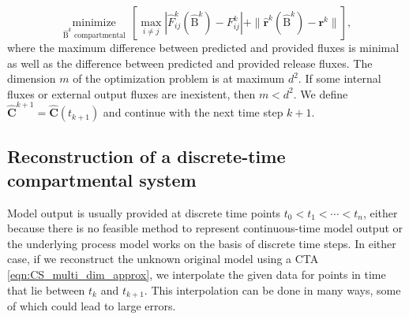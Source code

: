 \documentclass[11pt,a4paper]{article}
\newcommand{\red}[1]{\textcolor{red}{#1}}
\renewcommand{\vec}[1]{\mathbf{#1}}
\newcommand{\tens}[1]{\mathrm{#1}}
\begin{document}
        \begin{equation*}
            \underset{\widehat{\tens{B}}^k\text{ compartmental}}{\operatorname{minimize}}\,\left[\max\limits_{i\neq j} |\widehat{F}^k_{ij}(\widehat{\tens{B}}^k)-F^k_{ij}| + \|\widehat{\vec{r}}^k(\widehat{\tens{B}}^k)-\vec{r}^k \| \right],
        \end{equation*}
        where the maximum difference between predicted and provided fluxes is minimal as well as the difference between predicted and provided release fluxes. 
        The dimension $m$ of the optimization problem is at maximum $d^2$.
        If some internal fluxes or external output fluxes are inexistent, then $m<d^2$.
        We define $\widehat{\vec{C}}^{k+1}=\widehat{\vec{C}}(t_{k+1})$ and continue with the next time step $k+1$.\\
       
\subsection{Reconstruction of a discrete-time compartmental system}
    
    Model output is usually provided at discrete time points $t_0<t_1<\cdots<t_n$, either because there is no feasible method to represent continuous-time model output or the underlying process model works on the basis of discrete time steps.
    In either case, if we reconstruct the unknown original model using a CTA \eqref{eqn:CS_multi_dim_approx}, we interpolate the given data for points in time that lie between $t_k$ and $t_{k+1}$.
    This interpolation can be done in many ways, some of which could lead to large errors. %
    
\end{document}
